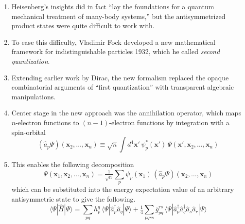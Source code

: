 \begin{enumerate}
    \item
        Heisenberg's insights did in fact ``lay the foundations for a quantum
        mechanical treatment of many-body systems,''\cite{Heisenberg:1926p411}
        but the antisymmetrized product states were quite difficult to work
        with.
    \item
        To ease this difficulty, Vladimir Fock developed a new mathematical
        framework for indistinguishable particles 1932, which he called
        {\itshape second quantization}.\cite{Fock:1932p622}
    \item
        Extending earlier work by Dirac,\cite{Dirac:1927p243} the new formalism
        replaced the opaque combinatorial arguments of ``first quantization''
        with transparent algebraic manipulations.
    \item
        Center stage in the new approach was the annihilation operator, which
        maps \(n\)-electron functions to \((n-1)\)-electron functions by
        integration with a spin-orbital
        \begin{equation}
            (\hat{a}_p\Psi)(\mathbf{x}_2, \ldots, \mathbf{x}_n)
            \equiv
            \sqrt{n}
            \int
            d^4\mathbf{x}'\,
            \psi_p^*(\mathbf{x}')\,
            \Psi(\mathbf{x}', \mathbf{x}_2, \ldots, \mathbf{x}_n)
        \end{equation}
    \item
        This enables the following decomposition
        \begin{equation}
            \Psi(\mathbf{x}_1, \mathbf{x}_2, \ldots, \mathbf{x}_n)
            =
            \tfrac{1}{\sqrt{n}}
            \sum_p
            \psi_p(\mathbf{x}_1)\,
            (\hat{a}_p\Psi)(\mathbf{x}_2, \ldots, \mathbf{x}_n)
        \end{equation}
        which can be substituted into the energy expectation value of an
        arbitrary antisymmetric state to give the following.
        \begin{equation}
            \label{eq:introduction:density-matrix-energy}
            \langle\Psi|\hat{H}|\Psi\rangle
            =
            \sum_{pq}
            h_p^q\,
            \langle \Psi| \hat{a}_p^\dagger \hat{a}_q|\Psi\rangle
            +
            \tfrac{1}{4}
            \sum_{pqrs}
            \overline{g}_{pq}^{rs}\,
            \langle \Psi|
            \hat{a}_p^\dagger \hat{a}_q^\dagger \hat{a}_s \hat{a}_r
            |\Psi\rangle
        \end{equation}

\end{enumerate}
